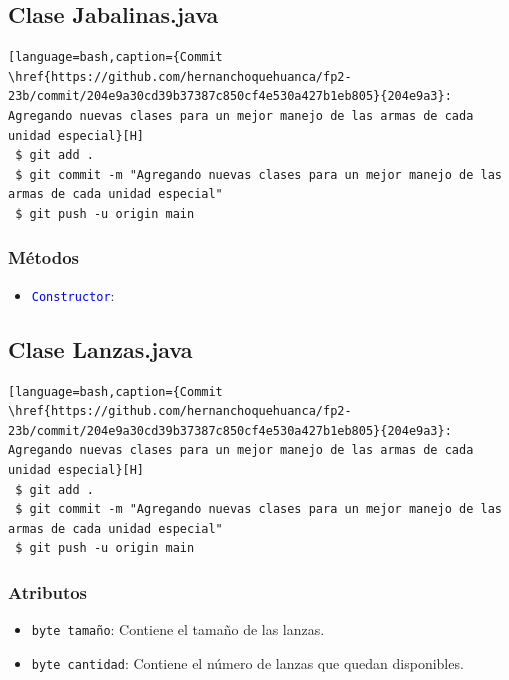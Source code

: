 \documentclass{article}
\begin{document}

\subsection{Clase Jabalinas.java}
\begin{lstlisting}[language=bash,caption={Commit \href{https://github.com/hernanchoquehuanca/fp2-23b/commit/204e9a30cd39b37387c850cf4e530a427b1eb805}{204e9a3}: Agregando nuevas clases para un mejor manejo de las armas de cada unidad especial}[H]
 $ git add .
 $ git commit -m "Agregando nuevas clases para un mejor manejo de las armas de cada unidad especial"			
 $ git push -u origin main
\end{lstlisting}

\subsubsection{Métodos}
\begin{itemize}
    \item \texttt{\textcolor{blue}{Constructor}}: 
\end{itemize}


\newpage
\subsection{Clase Lanzas.java}
\begin{lstlisting}[language=bash,caption={Commit \href{https://github.com/hernanchoquehuanca/fp2-23b/commit/204e9a30cd39b37387c850cf4e530a427b1eb805}{204e9a3}: Agregando nuevas clases para un mejor manejo de las armas de cada unidad especial}[H]
 $ git add .
 $ git commit -m "Agregando nuevas clases para un mejor manejo de las armas de cada unidad especial"			
 $ git push -u origin main
\end{lstlisting}

\subsubsection{Atributos}
\begin{itemize}
    \item \texttt{byte tamaño}: Contiene el tamaño de las lanzas.
    \item \texttt{byte cantidad}: Contiene el número de lanzas que quedan disponibles.
\end{itemize}

\end{document}
